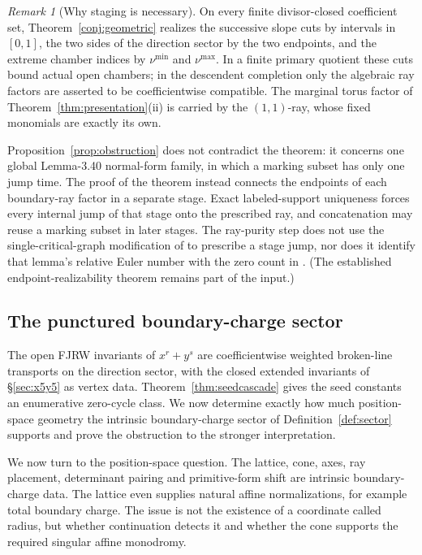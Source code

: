 \documentclass[11pt]{amsart}
\theoremstyle{definition}
\theoremstyle{remark}
\newtheorem{remark}[theorem]{Remark}
\begin{document}
\begin{remark}[Why staging is necessary]
\label{rem:conjform}
On every finite divisor-closed coefficient set,
Theorem~\ref{conj:geometric} realizes the successive slope cuts by intervals
in $[0,1]$, the two sides of the direction sector by the two endpoints, and the
extreme chamber indices by $\nu^{\min}$ and $\nu^{\max}$.  In a finite primary
quotient these cuts bound actual open chambers; in the descendent completion
only the algebraic ray factors are asserted to be coefficientwise compatible.
The marginal torus factor of
Theorem~\ref{thm:presentation}(ii) is carried by the $(1,1)$-ray, whose fixed
monomials are exactly its own.

Proposition~\ref{prop:obstruction} does not contradict the theorem: it concerns
one global Lemma-3.40 normal-form family, in which a marking subset has only one
jump time. The proof of the theorem instead connects the endpoints of each
boundary-ray factor in a separate stage. Exact labeled-support uniqueness forces
every internal jump of that stage onto the prescribed ray, and concatenation may
reuse a marking subset in later stages. The ray-purity step does not use the
single-critical-graph modification of \cite[Lem.~5.17]{GKT} to prescribe a
stage jump, nor does it identify that lemma's relative Euler number with the
zero count in \cite[Thm.~5.9]{GKT}. (The established endpoint-realizability
theorem \cite[Cor.~5.14]{GKT} remains part of the input.)
\end{remark}

\subsection{The punctured boundary-charge sector}
\label{ssec:missing}

The open FJRW invariants of $x^{r}+y^{s}$ are coefficientwise weighted
broken-line transports on the direction sector, with the closed extended invariants
of \S\ref{sec:x5y5} as vertex data.  Theorem~\ref{thm:seedcascade} gives the
seed constants an enumerative zero-cycle class.  We now determine exactly how
much position-space geometry the intrinsic
boundary-charge sector of Definition~\ref{def:sector} supports and prove the
obstruction to the stronger interpretation.

We now turn to the position-space question.  The lattice, cone, axes, ray
placement, determinant pairing and primitive-form shift are intrinsic
boundary-charge data.  The lattice even supplies natural affine
normalizations, for example total boundary charge.  The issue is not the
existence of a coordinate called radius, but whether continuation detects it
and whether the cone supports the required singular affine monodromy.
\end{document}
